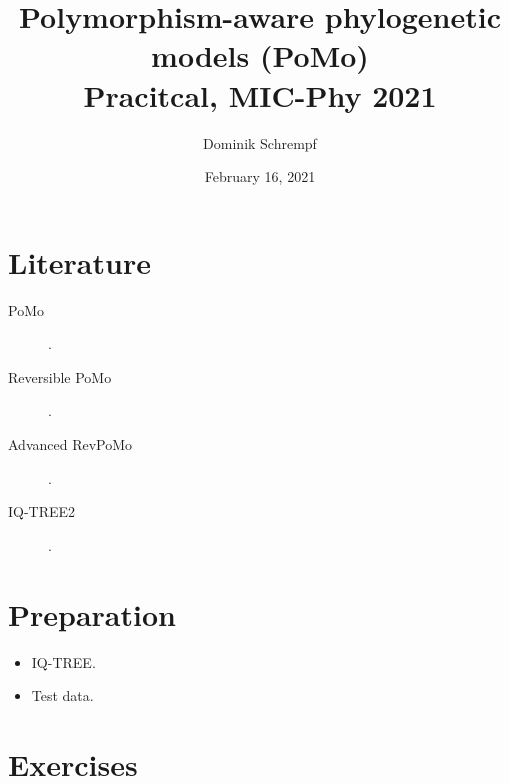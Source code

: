 \documentclass{myArticle}
\author{Dominik Schrempf}
\date{February 16, 2021}
\title{Polymorphism-aware phylogenetic models (PoMo)\\\medskip
\large Pracitcal, MIC-Phy 2021 }
\begin{document}
\maketitle

\section{Literature}
\label{sec:org7139098}
\begin{description}
\item[{PoMo}] \textcite{DeMaio2015}.
\item[{Reversible PoMo}] \textcite{Schrempf2016,Schrempf2017}.
\item[{Advanced RevPoMo}] \textcite{Schrempf2019}.
\item[{IQ-TREE2}] \textcite{Minh2020a}.
\end{description}

\section{Preparation}
\label{sec:orgb1be786}
\begin{itemize}
\item IQ-TREE.
\item Test data.
\end{itemize}

\section{Exercises}
\label{sec:org87474f8}

\printbibliography{}
\end{document}
